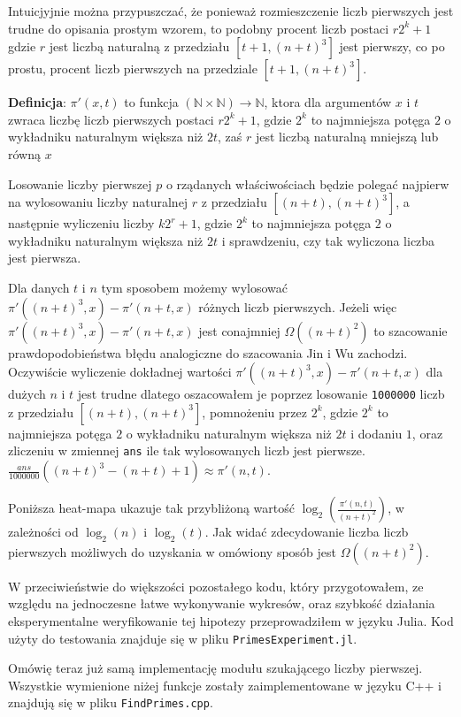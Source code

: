 \documentclass{article}
\begin{document}
Intuicjyjnie można przypuszczać, że ponieważ rozmieszczenie liczb pierwszych jest trudne 
do opisania prostym wzorem, to podobny procent liczb postaci $r2^k+1$ gdzie $r$ jest liczbą
naturalną z przedziału $[t+1,(n+t)^3]$ jest pierwszy, co po prostu, procent liczb 
pierwszych na przedziale $[t+1,(n+t)^3]$. 

\begin{tcolorbox}
    \textbf{Definicja}: $\pi'(x,t)$ to funkcja $(\mathbb{N} \times \mathbb{N}) \to \mathbb{N}$, ktora dla argumentów $x$ i
    $t$ zwraca liczbę liczb pierwszych postaci $r2^k+1$, gdzie $2^k$ to najmniejsza potęga $2$ o wykładniku naturalnym
    większa niż $2t$, zaś $r$ jest liczbą naturalną mniejszą lub równą $x$
\end{tcolorbox}

Losowanie liczby pierwszej $p$ o rządanych właściwościach będzie polegać najpierw na wylosowaniu liczby naturalnej $r$
z przedziału $[(n+t),(n+t)^3]$, a następnie wyliczeniu liczby $k2^r+1$, gdzie $2^k$ to najmniejsza potęga $2$ o wykładniku naturalnym większa niż $2t$ i sprawdzeniu, czy tak wyliczona liczba jest pierwsza.

Dla danych $t$ i $n$ tym sposobem możemy wylosować $\pi'((n+t)^3,x)-\pi'(n+t,x)$ różnych liczb pierwszych. Jeżeli 
więc $\pi'((n+t)^3,x)-\pi'(n+t,x)$ jest conajmniej $\Omega((n+t)^2)$ to szacowanie prawdopodobieństwa błędu analogiczne do szacowania 
Jin i Wu zachodzi. Oczywiście wyliczenie dokładnej wartości $\pi'((n+t)^3,x)-\pi'(n+t,x)$ dla dużych $n$ i $t$ jest trudne 
dlatego oszacowałem je poprzez losowanie \texttt{1000000} liczb z przedziału $[(n+t),(n+t)^3]$, pomnożeniu przez $2^k$, gdzie $2^k$ to najmniejsza potęga $2$ o wykładniku naturalnym
większa niż $2t$ i dodaniu $1$, oraz zliczeniu w zmiennej \texttt{ans} ile tak wylosowanych liczb jest pierwsze. 
$\frac{ans}{1000000}((n+t)^3-(n+t)+1) \approx \pi'(n,t)$.

Poniższa heat-mapa ukazuje tak przybliżoną wartość $\log_2(\frac{\pi'(n,t)}{(n+t)^2})$, w zależności od $\log_2(n)$ i $\log_2(t)$. Jak widać zdecydowanie liczba liczb pierwszych możliwych do uzyskania w omówiony sposób
jest $\Omega((n+t)^2)$.

W przeciwieństwie do większości pozostałego kodu, który przygotowałem, ze względu na jednoczesne łatwe wykonywanie wykresów, oraz szybkość działania eksperymentalne weryfikowanie
tej hipotezy przeprowadziłem w języku Julia. Kod użyty do testowania znajduje się  w pliku \texttt{PrimesExperiment.jl}.

Omówię teraz już samą implementację modułu szukającego liczby pierwszej. Wszystkie wymienione niżej funkcje zostały  zaimplementowane w języku C++ i znajdują się w pliku \texttt{FindPrimes.cpp}.
\end{document}
